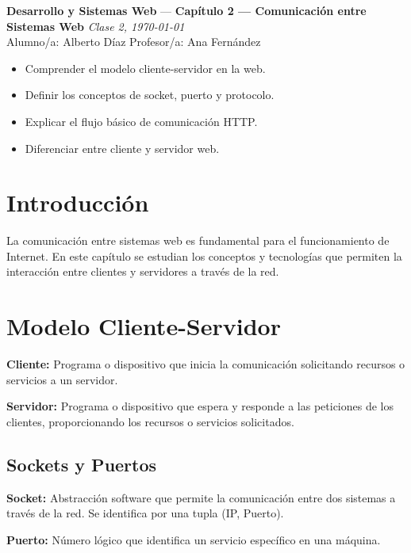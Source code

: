 \documentclass[11pt,a4paper]{article}
\newcommand{\asignatura}{Desarrollo y Sistemas Web}
\newcommand{\tema}{Capítulo 2 — Comunicación entre Sistemas Web}
\newcommand{\clase}{Clase 2}
\newcommand{\fecha}{\today}
\begin{document}
    {\large \textbf{\asignatura} \;—\; \textbf{\tema} \hfill \textit{\clase, \fecha}}\\[0.6em]
    \faUser\; Alumno/a: Alberto Díaz \hfill
    \faChalkboardTeacher\; Profesor/a: Ana Fernández

    \vspace{1em}
    \tableofcontents
    \vspace{1em}

    \begin{ObjetivosBox}
        \begin{itemize}
            \item Comprender el modelo cliente-servidor en la web.
            \item Definir los conceptos de socket, puerto y protocolo.
            \item Explicar el flujo básico de comunicación HTTP.
            \item Diferenciar entre cliente y servidor web.
        \end{itemize}
    \end{ObjetivosBox}

    \section{Introducción}
    La comunicación entre sistemas web es fundamental para el funcionamiento de Internet. En este capítulo se estudian los conceptos y tecnologías que permiten la interacción entre clientes y servidores a través de la red.

    \section{Modelo Cliente-Servidor}
    \begin{DefBox}
        \textbf{Cliente:} Programa o dispositivo que inicia la comunicación solicitando recursos o servicios a un servidor.

        \textbf{Servidor:} Programa o dispositivo que espera y responde a las peticiones de los clientes, proporcionando los recursos o servicios solicitados.
    \end{DefBox}

    \subsection{Sockets y Puertos}
    \begin{DefBox}
        \textbf{Socket:} Abstracción software que permite la comunicación entre dos sistemas a través de la red. Se identifica por una tupla (IP, Puerto).

        \textbf{Puerto:} Número lógico que identifica un servicio específico en una máquina.
    \end{DefBox}
\end{document}
